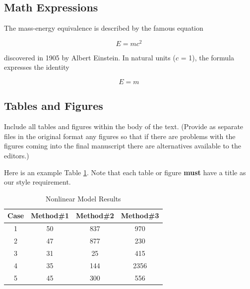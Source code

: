 \documentclass[article,twoside]{combine}
\begin{document}
\subsection{Math Expressions}
The mass-energy equivalence is described by the famous equation

$$E=mc^2$$

discovered in 1905 by Albert Einstein.
In natural units ($c$ = 1), the formula expresses the identity

\begin{equation}
E=m
\end{equation}

\subsection{Tables and Figures}
Include all tables and figures within the body of the text. (Provide as separate
files in the original format any figures so that if there are problems with the
figures coming into the final manuscript there are alternatives available to the editors.)

Here is an example Table \ref{table:nonlin}. Note that each table or figure \textbf{must} have
a title as our style requirement.

\begin{table}[ht]
\caption{Nonlinear Model Results} %
\label{table:nonlin} %
\centering %
\begin{tabular}{c c c c} %
\hline\hline %
Case & Method\#1 & Method\#2 & Method\#3 \\ [0.5ex] %
\hline %
1 & 50 & 837 & 970 \\ %
2 & 47 & 877 & 230 \\
3 & 31 & 25 & 415 \\
4 & 35 & 144 & 2356 \\
5 & 45 & 300 & 556 \\ [1ex] %
\hline %
\end{tabular}
\end{table}
\end{document}
